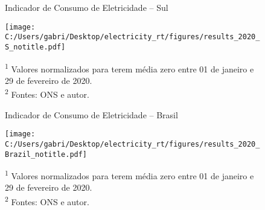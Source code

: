 \documentclass[12pt]{article}
\begin{document}
\begin{figure}[!htb]
	\centering
	\caption{Indicador de Consumo de Eletricidade -- Sul}
	\label{fig:figure5}	
	\texttt{[image: C:/Users/gabri/Desktop/electricity\_rt/figures/results\_2020\_S\_notitle.pdf]}
	\caption*{\textsuperscript{1} Valores normalizados para terem média zero entre 01 de janeiro e 29 de fevereiro de 2020. \\ \textsuperscript{2} Fontes: ONS e autor.}
\end{figure}

\begin{figure}[!htbp]
	\centering
	\caption{Indicador de Consumo de Eletricidade -- Brasil}
	\label{fig:figure6}	
	\texttt{[image: C:/Users/gabri/Desktop/electricity\_rt/figures/results\_2020\_Brazil\_notitle.pdf]}
	\caption*{\textsuperscript{1} Valores normalizados para terem média zero entre 01 de janeiro e 29 de fevereiro de 2020. \\ \textsuperscript{2} Fontes: ONS e autor.}
\end{figure}
\end{document}
